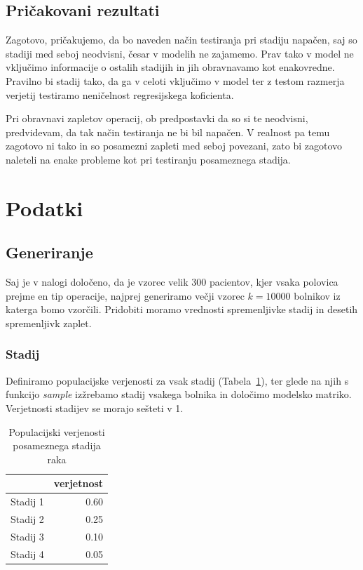\documentclass[letterpaper,11pt]{article}
\begin{document}
\subsection{Pričakovani rezultati}
Zagotovo, pričakujemo, da bo naveden način testiranja pri stadiju napačen, saj so stadiji med seboj neodvisni, česar v modelih ne zajamemo. Prav tako v model ne vključimo informacije o ostalih stadijih in jih obravnavamo kot enakovredne. Pravilno bi stadij tako,  da ga v celoti vključimo v model ter z testom razmerja verjetij testiramo neničelnost regresijskega koficienta.

\noindent Pri obravnavi zapletov operacij, ob predpostavki da so si te neodvisni, predvidevam, da tak način testiranja ne bi bil napačen. V realnost pa temu zagotovo ni tako in so posamezni zapleti med seboj povezani, zato bi zagotovo naleteli na enake probleme kot pri testiranju posameznega stadija.

\section{Podatki}
\subsection{Generiranje}
Saj je v nalogi določeno, da je vzorec velik 300 pacientov, kjer vsaka polovica prejme en tip operacije, najprej generiramo večji vzorec $k=10000$ bolnikov iz katerga bomo vzorčili. Pridobiti moramo vrednosti spremenljivke stadij in desetih spremenljivk zaplet.

\subsubsection{Stadij}
Definiramo populacijske verjenosti za vsak stadij (Tabela~\ref{table:1}), ter glede na njih s funkcijo \emph{sample} izžrebamo stadij vsakega bolnika in določimo modelsko matriko. Verjetnosti stadijev se morajo sešteti v 1.

\begin{table}[ht]
\centering
\begin{tabular}{rr}
  \hline
 & verjetnost \\ 
  \hline
Stadij 1 & 0.60 \\ 
  Stadij 2 & 0.25 \\ 
  Stadij 3 & 0.10 \\ 
  Stadij 4 & 0.05 \\ 
   \hline
\end{tabular}
\caption{Populacijski verjenosti posameznega stadija raka} 
\label{table:1}
\end{table}
\end{document}
